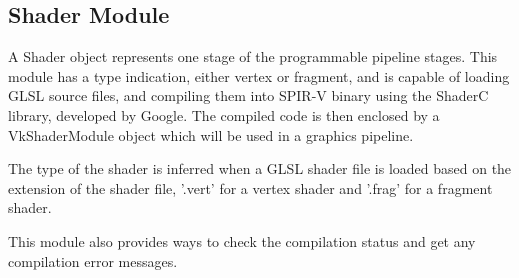 \subsection{Shader Module}
A Shader object represents one stage of the programmable pipeline stages. This module has a type indication, either vertex or fragment, and is capable of loading GLSL source files, and compiling them into SPIR-V binary using the ShaderC library, developed by Google. The compiled code is then enclosed by a VkShaderModule object which will be used in a graphics pipeline.

The type of the shader is inferred when a GLSL shader file is loaded based on the extension of the shader file, '.vert' for a vertex shader and '.frag' for a fragment shader.

This module also provides ways to check the compilation status and get any compilation error messages.
